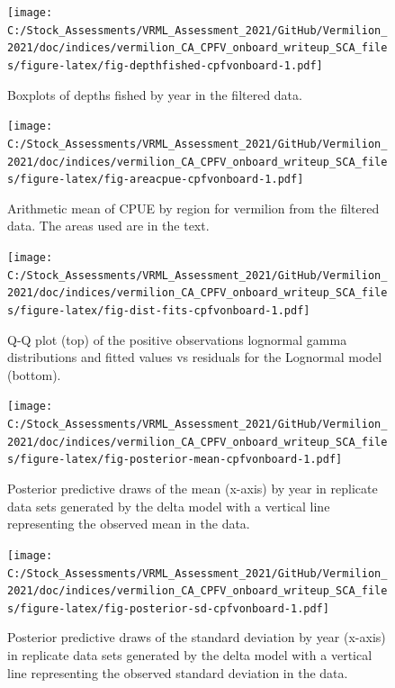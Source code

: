 \documentclass[11pt,
  english,
]{article}
\begin{document}
\FloatBarrier

\begin{figure}
\centering
\texttt{[image: C:/Stock\_Assessments/VRML\_Assessment\_2021/GitHub/Vermilion\_2021/doc/indices/vermilion\_CA\_CPFV\_onboard\_writeup\_SCA\_files/figure-latex/fig-depthfished-cpfvonboard-1.pdf]}
\caption{\label{fig:fig-depthfished-cpfvonboard}Boxplots of depths fished by year in the filtered data.}
\end{figure}

\FloatBarrier

\begin{figure}
\centering
\texttt{[image: C:/Stock\_Assessments/VRML\_Assessment\_2021/GitHub/Vermilion\_2021/doc/indices/vermilion\_CA\_CPFV\_onboard\_writeup\_SCA\_files/figure-latex/fig-areacpue-cpfvonboard-1.pdf]}
\caption{\label{fig:fig-areacpue-cpfvonboard}Arithmetic mean of CPUE by region for vermilion from the filtered data. The areas used are in the text.}
\end{figure}

\begin{figure}
\centering
\texttt{[image: C:/Stock\_Assessments/VRML\_Assessment\_2021/GitHub/Vermilion\_2021/doc/indices/vermilion\_CA\_CPFV\_onboard\_writeup\_SCA\_files/figure-latex/fig-dist-fits-cpfvonboard-1.pdf]}
\caption{\label{fig:fig-dist-fits-cpfvonboard}Q-Q plot (top) of the positive observations lognormal gamma distributions and fitted values vs residuals for the Lognormal model (bottom).}
\end{figure}

\begin{figure}
\centering
\texttt{[image: C:/Stock\_Assessments/VRML\_Assessment\_2021/GitHub/Vermilion\_2021/doc/indices/vermilion\_CA\_CPFV\_onboard\_writeup\_SCA\_files/figure-latex/fig-posterior-mean-cpfvonboard-1.pdf]}
\caption{\label{fig:fig-posterior-mean-cpfvonboard}Posterior predictive draws of the mean (x-axis) by year in replicate data sets generated by the delta model with a vertical line representing the observed mean in the data.}
\end{figure}

\FloatBarrier

\begin{figure}
\centering
\texttt{[image: C:/Stock\_Assessments/VRML\_Assessment\_2021/GitHub/Vermilion\_2021/doc/indices/vermilion\_CA\_CPFV\_onboard\_writeup\_SCA\_files/figure-latex/fig-posterior-sd-cpfvonboard-1.pdf]}
\caption{\label{fig:fig-posterior-sd-cpfvonboard}Posterior predictive draws of the standard deviation by year (x-axis) in replicate data sets generated by the delta model with a vertical line representing the observed standard deviation in the data.}
\end{figure}
\end{document}
